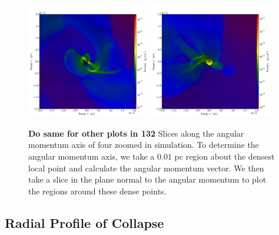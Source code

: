 \documentclass{emulateapj}
\begin{document}
\begin{figure}
\includegraphics[width=0.48\textwidth]{movie_disk_0132_0002.png}
\includegraphics[width=0.48\textwidth]{movie_disk_0132_0004.png}
\caption{{\bf Do same for other plots in 132} Slices along the angular momentum axis of four zoomed in simulation. To determine the angular momentum axis, we take a $0.01$ pc region about the densest local point and calculate the angular momentum vector. We then take a slice in the plane normal to the angular momentum to plot the regions around these dense points. \label{fig:snapshots 2}}
\end{figure}


 


\subsection{Radial Profile of Collapse}
\end{document}
